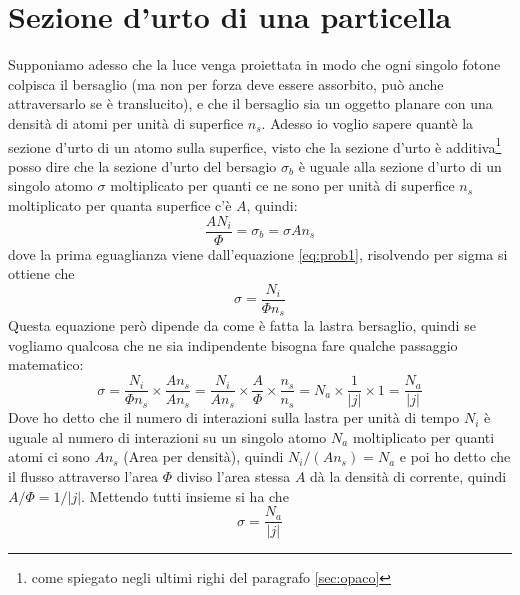 \documentclass[11pt,a4paper]{article}
\begin{document}
	\section{Sezione d'urto di una particella}
		Supponiamo adesso che la luce venga proiettata in modo che ogni singolo fotone colpisca il bersaglio (ma non per forza deve essere assorbito, può anche attraversarlo se è translucito), e che il bersaglio sia un oggetto planare con una densità di atomi per unità di superfice $n_s$.\newline
		Adesso io voglio sapere quantè la sezione d'urto di un atomo sulla superfice, visto che la sezione d'urto è additiva\footnote{come spiegato negli ultimi righi del paragrafo \ref{sec:opaco}} posso dire che la sezione d'urto del bersagio $\sigma_b$ è uguale alla sezione d'urto di un singolo atomo $\sigma$ moltiplicato per quanti ce ne sono per unità di superfice $n_s$ moltiplicato per quanta superfice c'è $A$, quindi:
		\[
			\frac{AN_i}\Phi=\sigma_b=\sigma A n_s
		\]
		dove la prima eguaglianza viene dall'equazione \ref{eq:prob1}, risolvendo per sigma si ottiene che 
		\begin{equation}
			\sigma=\frac{N_i}{\Phi n_s}
		\end{equation}
		Questa equazione però dipende da come è fatta la lastra bersaglio, quindi se vogliamo qualcosa che ne sia indipendente bisogna fare qualche passaggio matematico:
		\[
			\sigma=\frac{N_i}{\Phi n_s}\times \frac{An_s}{An_s}=
			\frac{N_i}{An_s}\times\frac A\Phi\times \frac {n_s}{n_s}=
			N_a\times \frac1{|j|}\times 1=\frac{N_a}{|j|}
		\]
		Dove ho detto che il numero di interazioni sulla lastra per unità di tempo $N_i$ è uguale al numero di interazioni su un singolo atomo $N_a$ moltiplicato per quanti atomi ci sono $An_s$ (Area per densità), quindi $N_i/(An_s)=N_a$ e poi ho detto che il flusso attraverso l'area $\Phi$ diviso l'area stessa $A$ dà la densità di corrente, quindi $A/\Phi=1/|j|$.\newline
		Mettendo tutti insieme si ha che 
		\begin{equation}
			\sigma=\frac{N_a}{|j|}
		\end{equation}


		
\end{document}
